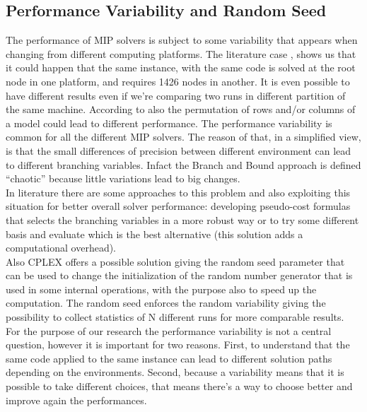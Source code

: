 \begin{appendices}
\chapter{Performance Variability and Random Seed}
The performance of MIP solvers is subject to some variability that appears when changing from different computing platforms. The literature case \cite{danna2008performance}, shows us that it could happen that the same instance, with the same code is solved at the root node in one platform, and requires 1426 nodes in another. It is even possible to have different results even if we’re comparing two runs in different partition of the same machine. According to \cite{lodi2013performance} also the permutation of rows and/or columns of a model could lead to different performance. The performance variability is common for all the different MIP solvers. 
The reason of that, in a simplified view, is that the small differences of precision between different environment can lead to different branching variables. Infact the Branch and Bound approach is defined “chaotic” because little variations lead to big changes. \\
In literature there are some approaches to this problem and also exploiting this situation for better overall solver performance: developing pseudo-cost formulas that selects the branching variables in a more robust way or to try some different basis and evaluate which is the best alternative (this solution adds a computational overhead). \\
Also CPLEX offers a possible solution giving the random seed parameter that can be used to change the initialization of the random number generator that is used in some internal operations, with the purpose also to speed up the computation. The random seed  enforces the random variability giving the possibility to collect statistics of N different runs for more comparable results. \\
For the purpose of our research the performance variability is not a central question, however it is important for two reasons. First, to understand that the same code applied to the same instance can lead to different solution paths depending on the environments. Second, because a variability means that it is possible to take different choices, that means there’s a way to choose better and improve again the performances. 



\end{appendices}



